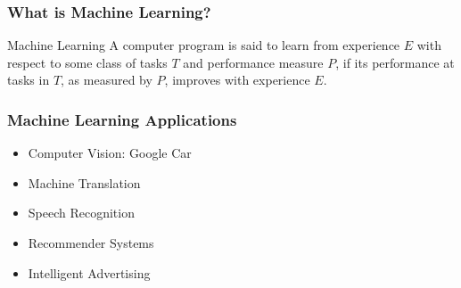 \begin{frame}
  \frametitle{What is Machine Learning?}
  \begin{block}{Machine Learning}
    A computer program is said to learn from experience $E$ with
    respect to some class of tasks $T$ and performance measure $P$, if
    its performance at tasks in $T$, as measured by $P$, improves with
    experience $E$.
  \end{block}
\end{frame}

\begin{frame}
  \frametitle{Machine Learning Applications}
  \begin{itemize}
  \item Computer Vision: Google Car
  \item Machine Translation
  \item Speech Recognition
  \item Recommender Systems
  \item Intelligent Advertising
  \end{itemize}
\end{frame}

